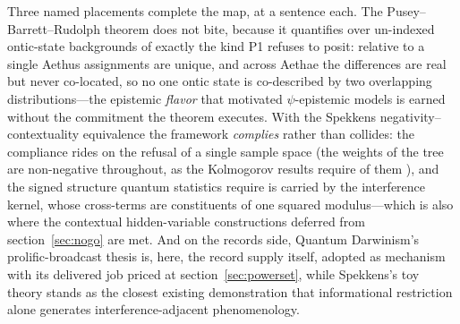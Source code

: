\documentclass[11pt]{article}
\theoremstyle{definition}
\newcommand{\Aethus}{Aethus}
\begin{document}
Three named placements complete the map, at a sentence each. The Pusey--Barrett--Rudolph theorem \cite{pusey2012reality} does not bite, because it quantifies over un-indexed ontic-state backgrounds of exactly the kind P1 refuses to posit: relative to a single \Aethus{} assignments are unique, and across Aethae the differences are real but never co-located, so no one ontic state is co-described by two overlapping distributions---the epistemic \emph{flavor} that motivated $\psi$-epistemic models is earned without the commitment the theorem executes. With the Spekkens negativity--contextuality equivalence \cite{spekkens2008negativity} the framework \emph{complies} rather than collides: the compliance rides on the refusal of a single sample space (the weights of the tree are non-negative throughout, as the Kolmogorov results require of them \cite{Aethus}), and the signed structure quantum statistics require is carried by the interference kernel, whose cross-terms are constituents of one squared modulus---which is also where the contextual hidden-variable constructions \cite{kochen1967} deferred from section~\ref{sec:nogo} are met. And on the records side, Quantum Darwinism's prolific-broadcast thesis \cite{zurek2009quantum} is, here, the record supply itself, adopted as mechanism with its delivered job priced at section~\ref{sec:powerset}, while Spekkens's toy theory \cite{spekkens2007evidence} stands as the closest existing demonstration that informational restriction alone generates interference-adjacent phenomenology.
\end{document}
